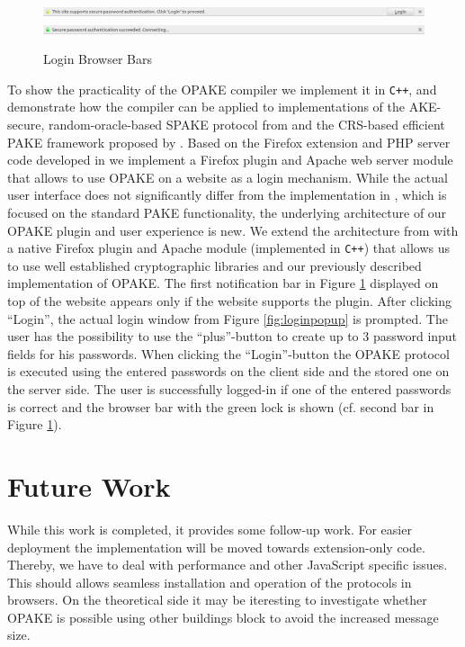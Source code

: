 \begin{figure}[b!]
	\centering
	\includegraphics[width=\textwidth]{img/LoginBar.png}
	\includegraphics[width=\textwidth]{img/LoginSuccess.png}
	\caption{Login Browser Bars}\label{fig:loginbar}
\end{figure}
\noindent
To show the practicality of the \ac{OPAKE} compiler we implement it in \verb/C++/, and demonstrate how the compiler can be applied to implementations of the \ac{AKE}-secure, random-oracle-based SPAKE protocol from \cite{Abdalla2005} and the \ac{CRS}-based efficient \ac{PAKE} framework proposed by \citeauthor{Gennaro2008} \cite{Gennaro2008}.
Based on the Firefox extension and PHP server code developed in \cite{MSD13} we implement a Firefox plugin and Apache web server module that allows to use \ac{OPAKE} on a website as a login mechanism.
While the actual user interface does not significantly differ from the implementation in \cite{MSD13}, which is focused on the standard PAKE functionality, the underlying architecture of our \ac{OPAKE} plugin and user experience is new.
We extend the architecture from \cite{MSD13} with a native Firefox plugin and Apache module (implemented in \texttt{C++}) that allows us to use well established cryptographic libraries and our previously described implementation of \ac{OPAKE}.
The first notification bar in Figure \ref{fig:loginbar} displayed on top of the website appears only if the website supports the plugin.
After clicking ``Login'', the actual login window from Figure \ref{fig:loginpopup} is prompted.
The user has the possibility to use the ``plus''-button to create up to $3$ password input fields for his passwords.
When clicking the ``Login''-button the \ac{OPAKE} protocol is executed using the entered passwords on the client side and the stored one on the server side.
The user is successfully logged-in if one of the entered passwords is correct and the browser bar with the green lock is shown (cf. second bar in Figure \ref{fig:loginbar}).

\section{Future Work}
While this work is completed, it provides some follow-up work.
For easier deployment the implementation will be moved towards extension-only code.
Thereby, we have to deal with performance and other JavaScript specific issues.
This should allows seamless installation and operation of the protocols in browsers.
On the theoretical side it may be iteresting to investigate whether \ac{OPAKE} is possible using other buildings block to avoid the increased message size.


